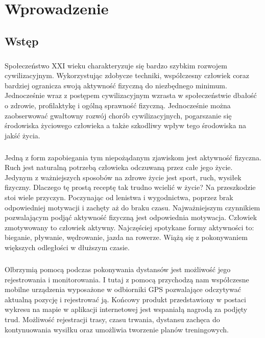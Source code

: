 \chapter{Wprowadzenie}

\section{Wstęp} %
\label{sec:wst_p}
\paragraph{} %
\label{par:}

Społeczeństwo XXI wieku charakteryzuje się bardzo szybkim rozwojem cywilizacyjnym.
Wykorzystując zdobycze techniki, współczesny człowiek coraz bardziej ogranicza swoją aktywność fizyczną do niezbędnego minimum. Jednocześnie wraz z postępem cywilizacyjnym wzrasta w społeczeństwie dbałość o zdrowie, profilaktykę i ogólną sprawność fizyczną. Jednocześnie można zaobserwować gwałtowny rozwój chorób cywilizacyjnych, pogarszanie się środowiska życiowego człowieka a także szkodliwy wpływ tego środowiska na jakść życia.

\paragraph{} %
\label{par:}
Jedną z form zapobiegania tym niepożądanym zjawiskom jest aktywność fizyczna. Ruch jest naturalną potrzebą człowieka odczuwaną przez całe jego życie. Jedynym z ważniejszych sposobów na zdrowe życie jest sport, ruch, wysiłek fizyczny. 
Dlaczego tę prostą receptę tak trudno wcielić w życie? Na przeszkodzie stoi wiele przyczyn. Poczynając od lenistwa i wygodnictwa, poprzez brak odpowiedniej motywacji i zachęty aż do braku czasu.
Najważniejszym czynnikiem pozwalającym podjąć aktywność fizyczną jest odpowiednia motywacja. Człowiek zmotywowany to człowiek aktywny. 
Najczęściej spotykane formy aktywności to: bieganie, pływanie, wędrowanie, jazda na rowerze. Wiążą się z pokonywaniem większych odległości w dłuższym czasie.


\paragraph{} %
 \label{par:} 
Olbrzymią pomocą podczas pokonywania dystansów jest możliwość jego rejestrowania i monitorowania. I tutaj z pomocą przychodzą nam współczesne mobilne urządzenia wyposażone w odbiorniki GPS pozwalające odczytywać aktualną pozycję i rejestrować ją. Końcowy produkt przedstawiony w postaci wykresu na mapie w aplikacji internetowej jest wspaniałą nagrodą za podjęty trud. Możliwość rejestracji trasy, czasu trwania, dystansu zachęca do kontynuowania wysiłku oraz umożliwia tworzenie planów treningowych.

